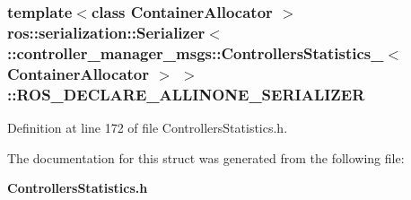 \subsubsection[{\-R\-O\-S\-\_\-\-D\-E\-C\-L\-A\-R\-E\-\_\-\-A\-L\-L\-I\-N\-O\-N\-E\-\_\-\-S\-E\-R\-I\-A\-L\-I\-Z\-E\-R}]{\setlength{\rightskip}{0pt plus 5cm}template$<$class Container\-Allocator $>$ ros\-::serialization\-::\-Serializer$<$ \-::{\bf controller\-\_\-manager\-\_\-msgs\-::\-Controllers\-Statistics\-\_\-}$<$ \-Container\-Allocator $>$ $>$\-::{\bf \-R\-O\-S\-\_\-\-D\-E\-C\-L\-A\-R\-E\-\_\-\-A\-L\-L\-I\-N\-O\-N\-E\-\_\-\-S\-E\-R\-I\-A\-L\-I\-Z\-E\-R}}\label{structros_1_1serialization_1_1Serializer_3_01_1_1controller__manager__msgs_1_1ControllersStatistb32e2fe98775231ccb59b9cbb6bf3d16_af65b095bda854cbfa968685df859cc6b}


\-Definition at line 172 of file \-Controllers\-Statistics.\-h.



\-The documentation for this struct was generated from the following file\-:\begin{DoxyCompactItemize}
\item 
{\bf \-Controllers\-Statistics.\-h}\end{DoxyCompactItemize}
